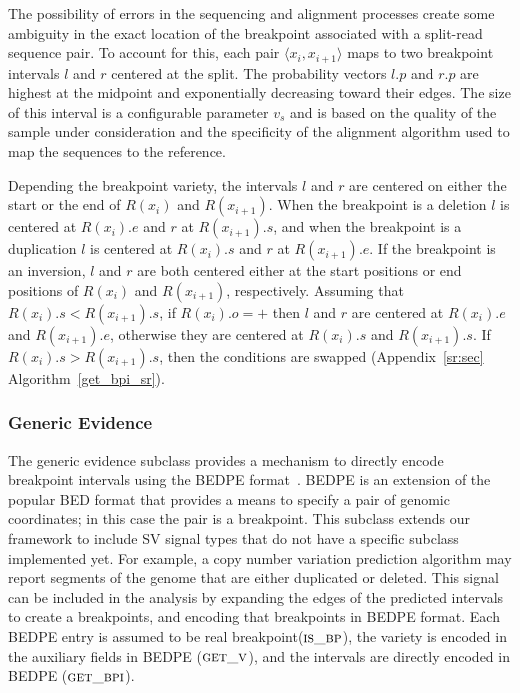 \documentclass[10pt]{bmc_article}
\newenvironment{bmcformat}{\begin{raggedright}\baselineskip20pt\sloppy\setboolean{publ}{false}}{\end{raggedright}\baselineskip20pt\sloppy}
\begin{document}
\begin{bmcformat}
The possibility of errors in the sequencing and alignment processes create some
ambiguity in the exact location of the breakpoint associated with a split-read
sequence pair.  To account for this, each pair $\langle x_i, x_{i+1} \rangle$
maps to two breakpoint intervals $l$ and $r$ centered at the split. The
probability vectors $l.p$ and $r.p$ are highest at the midpoint and
exponentially decreasing toward their edges.  The size of this interval is a
configurable parameter $v_s$ and is based on the quality of the sample under
consideration and the specificity of the alignment algorithm used to map the
sequences to the reference.

Depending the breakpoint variety, the intervals $l$ and $r$ are centered on
either the start or the end of $R(x_i)$ and $R(x_{i+1})$.  When the breakpoint
is a deletion $l$ is centered at $R(x_i).e$ and $r$ at $R(x_{i+1}).s$, and when
the breakpoint is a duplication $l$ is centered at $R(x_i).s$ and $r$ at
$R(x_{i+1}).e$.  If the breakpoint is an inversion, $l$ and $r$ are both
centered either at the start positions or end positions of $R(x_i)$ and
$R(x_{i+1})$, respectively.  Assuming that $R(x_i).s<R(x_{i+1}).s$, if
$R(x_i).o=+$ then $l$ and $r$ are centered at $R(x_i).e$ and  $R(x_{i+1}).e$,
otherwise they are centered at $R(x_i).s$ and  $R(x_{i+1}).s$.  If
$R(x_i).s>R(x_{i+1}).s$, then the conditions are swapped
(Appendix~\ref{sr:sec} Algorithm~\ref{get_bpi_sr}).

\subsubsection*{Generic Evidence}

The generic evidence subclass provides a mechanism to directly encode breakpoint
intervals using the BEDPE format~\cite{quinlan2010a}.  BEDPE is an extension of
the popular BED format that provides a means to specify a pair of genomic
coordinates; in this case the pair is a breakpoint.  This subclass extends our
framework to include SV signal types that do not have a specific subclass
implemented yet.  For example, a copy number variation prediction algorithm may
report segments of the genome that are either duplicated or deleted.  This
signal can be included in the analysis by expanding the edges of the predicted
intervals to create a breakpoints, and encoding that breakpoints in BEDPE
format.
Each BEDPE entry is assumed to be real breakpoint($\textsc{is\_bp}$), the
variety is encoded in the auxiliary fields in BEDPE ($\textsc{get\_v}$), and the
intervals are directly encoded in BEDPE ($\textsc{get\_bpi}$).



\end{bmcformat}
\end{document}
